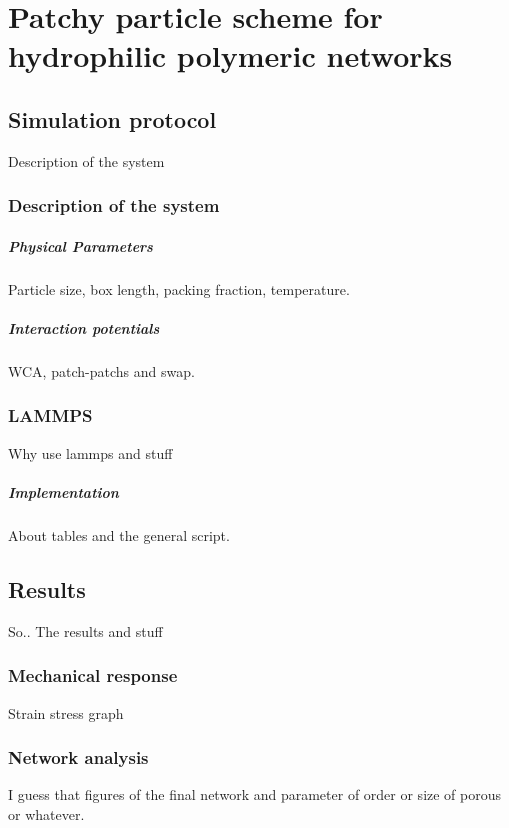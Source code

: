 \chapter{Patchy particle scheme for hydrophilic polymeric networks}

\section{Simulation protocol}

Description of the system

\subsection{Description of the system}

\paragraph{Physical Parameters} Particle size, box length, packing fraction, temperature.

\paragraph{Interaction potentials} WCA, patch-patchs and swap.

\subsection{LAMMPS}

Why use lammps and stuff

\paragraph{Implementation} About tables and the general script.


\section{Results}

So.. The results and stuff

\subsection{Mechanical response}

Strain stress graph

\subsection{Network analysis}

I guess that figures of the final network and parameter of order or size of porous or whatever.

